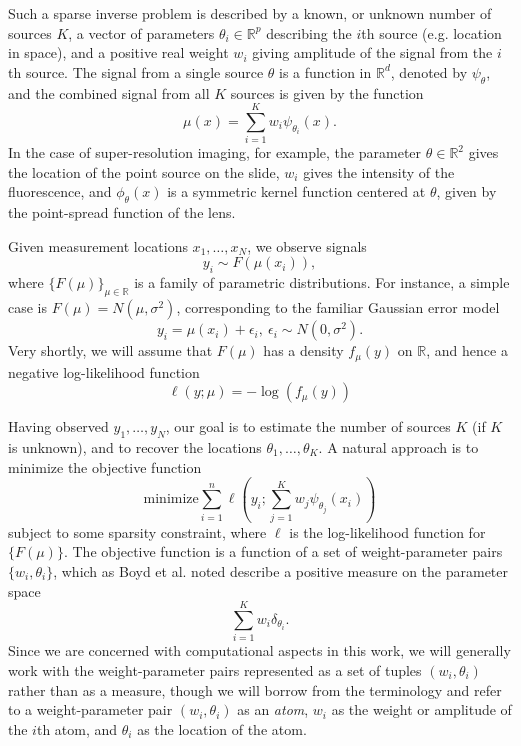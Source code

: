 \documentclass[11pt]{article}
\begin{document}
Such a sparse inverse problem is described by a known,
or unknown number of sources $K$, a vector of parameters $\theta_i \in
\mathbb{R}^p$ describing the $i$th source (e.g. location in space),
and a positive real weight $w_i$ giving amplitude of the signal from
the $i$th source.  The signal from a single source $\theta$ is a
function in $\mathbb{R}^d$, denoted by $\psi_\theta$,
and the combined signal from all $K$ sources is given by the function
\[
\mu(x) = \sum_{i=1}^K w_i \psi_{\theta_i}(x).
\]
In the case of super-resolution imaging, for example, the parameter
$\theta \in \mathbb{R}^2$ gives the location of the point source on
the slide, $w_i$ gives the intensity of the fluorescence, and
$\phi_{\theta}(x)$ is a symmetric kernel function centered at $\theta$,
given by the point-spread function of the lens.

Given measurement locations $x_1,\hdots, x_N$, we observe signals
\[
y_i \sim F(\mu(x_i)),
\]
where $\{F(\mu)\}_{\mu \in \mathbb{R}}$ is a family of parametric distributions.
For instance, a simple case is $F(\mu) = N(\mu, \sigma^2)$, corresponding to the familiar Gaussian error model
\[
y_i = \mu(x_i) + \epsilon_i, \ \epsilon_i \sim N(0, \sigma^2).
\]
Very shortly, we will assume that $F(\mu)$ has a density $f_\mu(y)$ on $\mathbb{R}$,
and hence a negative log-likelihood function
\[
\ell(y; \mu) = -\log(f_\mu(y))
\]

Having observed $y_1,\hdots, y_N$, our goal is to estimate the number
of sources $K$ (if $K$ is unknown), and to recover the locations
$\theta_1,\hdots, \theta_K$.
A natural approach is to minimize the objective function
\[
\text{minimize} \sum_{i=1}^n \ell\left(y_i; \sum_{j=1}^K w_j \psi_{\theta_j}(x_i) \right)
\]
subject to some sparsity constraint, where $\ell$ is the
log-likelihood function for $\{F(\mu)\}$.  
The objective function is a function of a set of weight-parameter pairs $\{w_i, \theta_i\}$,
which as Boyd et al. noted describe a positive measure on the parameter space
\[
\sum_{i=1}^K w_i \delta_{\theta_i}.
\]
Since we are concerned with computational aspects in this work, we
will generally work with the weight-parameter pairs represented as a
set of tuples $(w_i,\theta_i)$ rather than as a measure, though we
will borrow from the terminology and refer to a weight-parameter pair
$(w_i,\theta_i)$ as an \emph{atom}, $w_i$ as the weight or amplitude
of the $i$th atom, and $\theta_i$ as the location of the atom.
\end{document}

